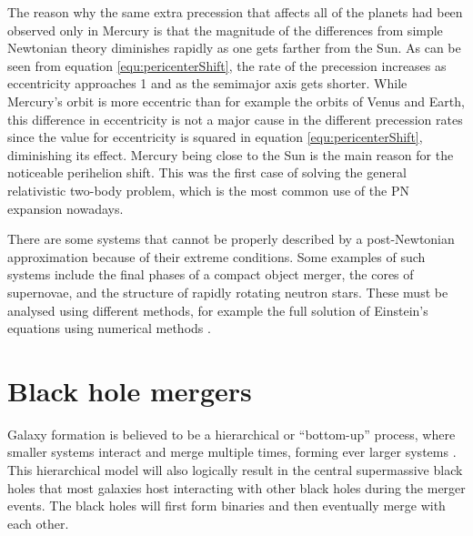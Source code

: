 \documentclass[english, oneside]{HYgradu}
\begin{document}
The reason why the same extra precession that affects all of the planets had been observed only in Mercury is that the magnitude of the differences from simple Newtonian theory diminishes rapidly as one gets farther from the Sun. As can be seen from equation \eqref{equ:pericenterShift}, the rate of the precession increases as eccentricity approaches 1 and as the semimajor axis gets shorter. While Mercury's orbit is more eccentric than for example the orbits of Venus and Earth, this difference in eccentricity is not a major cause in the different precession rates since the value for eccentricity is squared in equation \eqref{equ:pericenterShift}, diminishing its effect. Mercury being close to the Sun is the main reason for the noticeable perihelion shift.
This was the first case of solving the general relativistic two-body problem, which is the most common use of the PN expansion nowadays.
%

There are some systems that cannot be properly described by a post-Newtonian approximation because of their extreme conditions. Some examples of such systems include the final phases of a compact object merger, the cores of supernovae, and the structure of rapidly rotating neutron stars. These must be analysed using different methods, for example the full solution of Einstein's equations using numerical methods \citep{will:2006}. 

\section{Black hole mergers}

Galaxy formation is believed to be a hierarchical or ``bottom-up'' process, where smaller systems interact and merge multiple times, forming ever larger systems \citep{bt-galdyn}. This hierarchical model will also logically result in the central supermassive black holes that most galaxies host interacting with other black holes during the merger events. The black holes will first form binaries and then eventually merge with each other.
\end{document}
